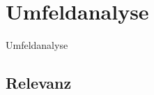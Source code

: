 \newpage

\section{Umfeldanalyse} \label{umfeldanalyse}
Umfeldanalyse

\subsection{Relevanz} \label{relevanz}

